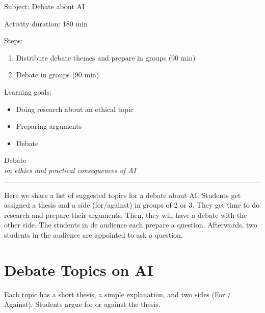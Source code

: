 \documentclass[12pt]{article}
\newcounter{question}
\begin{document}
\vspace*{0.5\textheight}

Subject: Debate about AI

Activity duration: 180 min

\vspace{0.5cm}

Steps:
\begin{enumerate}
    \item Distribute debate themes and prepare in groups (90 min)
    \item Debate in groups (90 min)
\end{enumerate}

Learning goals:

\begin{itemize}
    \item Doing research about an ethical topic
    \item Preparing arguments
    \item Debate
\end{itemize}

\newpage

\begin{center}
    {\Huge \color{maincolor} Debate}\\[5pt]
    {\large \textit{on ethics and practical consequences of AI}}\\
    \rule{\linewidth}{1pt}
\end{center}

\vspace{0.5cm}

Here we share a list of suggested topics for a debate about AI. Students get assigned a thesis and a side (for/against) in groups of 2 or 3. They get time to do research and prepare their arguments. 
Then, they will have a debate with the other side. The students in de audience each prepare a question. Afterwards, two students in the audience are appointed to ask a question. 


\section*{Debate Topics on AI}


Each topic has a short thesis, a simple explanation, and two sides (For / Against). Students argue for or against the thesis.
\end{document}
